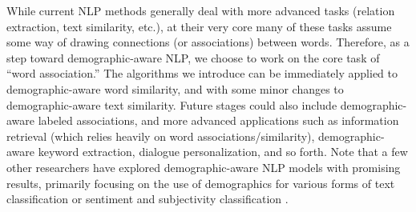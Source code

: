\documentclass[11pt,letterpaper]{article}
\begin{document}
While current NLP methods generally deal with more advanced tasks (relation extraction, text similarity, etc.), at their very core many of these tasks assume some way of drawing connections (or associations) between words. Therefore, as a step toward demographic-aware NLP, we choose to work on the core task of ``word association.'' The algorithms we introduce can be immediately applied to demographic-aware word similarity, and with some minor changes to demographic-aware text similarity. Future stages could also include demographic-aware labeled associations, and more advanced applications such as information retrieval (which relies heavily on word associations/similarity), demographic-aware keyword extraction, dialogue personalization, and so forth. Note that a few other researchers have explored demographic-aware NLP models with promising results, primarily focusing on the use of demographics for various forms of text classification \cite{Hovy2015} or sentiment and subjectivity classification \cite{Volkova2013}.
\end{document}
